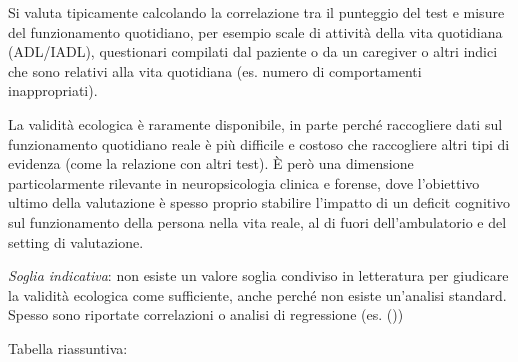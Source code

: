 \documentclass[
  italian,
  letterpaper,
  paper=A4,
  headinclude=on,
  footinclude=on,
  12pt]{scrbook}
\begin{document}
Si valuta tipicamente calcolando la correlazione tra il punteggio del
test e misure del funzionamento quotidiano, per esempio scale di
attività della vita quotidiana (ADL/IADL), questionari compilati dal
paziente o da un caregiver o altri indici che sono relativi alla vita
quotidiana (es. numero di comportamenti inappropriati).

La validità ecologica è raramente disponibile, in parte perché
raccogliere dati sul funzionamento quotidiano reale è più difficile e
costoso che raccogliere altri tipi di evidenza (come la relazione con
altri test). È però una dimensione particolarmente rilevante in
neuropsicologia clinica e forense, dove l'obiettivo ultimo della
valutazione è spesso proprio stabilire l'impatto di un deficit cognitivo
sul funzionamento della persona nella vita reale, al di fuori
dell'ambulatorio e del setting di valutazione.

\emph{Soglia indicativa}: non esiste un valore soglia condiviso in
letteratura per giudicare la validità ecologica come sufficiente, anche
perché non esiste un'analisi standard. Spesso sono riportate
correlazioni o analisi di regressione (es.
(\cite{higginson2000ecological}))

Tabella riassuntiva:
\end{document}
